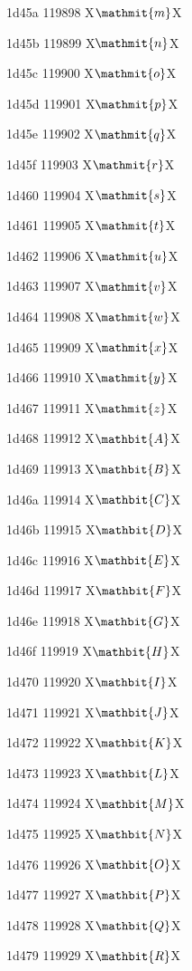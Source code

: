 \documentclass[11pt]{article}
\begin{document}
1d45a 119898 X{\ensuremath{\mathmit{m}}}X

1d45b 119899 X{\ensuremath{\mathmit{n}}}X

1d45c 119900 X{\ensuremath{\mathmit{o}}}X

1d45d 119901 X{\ensuremath{\mathmit{p}}}X

1d45e 119902 X{\ensuremath{\mathmit{q}}}X

1d45f 119903 X{\ensuremath{\mathmit{r}}}X

1d460 119904 X{\ensuremath{\mathmit{s}}}X

1d461 119905 X{\ensuremath{\mathmit{t}}}X

1d462 119906 X{\ensuremath{\mathmit{u}}}X

1d463 119907 X{\ensuremath{\mathmit{v}}}X

1d464 119908 X{\ensuremath{\mathmit{w}}}X

1d465 119909 X{\ensuremath{\mathmit{x}}}X

1d466 119910 X{\ensuremath{\mathmit{y}}}X

1d467 119911 X{\ensuremath{\mathmit{z}}}X

1d468 119912 X{\ensuremath{\mathbit{A}}}X

1d469 119913 X{\ensuremath{\mathbit{B}}}X

1d46a 119914 X{\ensuremath{\mathbit{C}}}X

1d46b 119915 X{\ensuremath{\mathbit{D}}}X

1d46c 119916 X{\ensuremath{\mathbit{E}}}X

1d46d 119917 X{\ensuremath{\mathbit{F}}}X

1d46e 119918 X{\ensuremath{\mathbit{G}}}X

1d46f 119919 X{\ensuremath{\mathbit{H}}}X

1d470 119920 X{\ensuremath{\mathbit{I}}}X

1d471 119921 X{\ensuremath{\mathbit{J}}}X

1d472 119922 X{\ensuremath{\mathbit{K}}}X

1d473 119923 X{\ensuremath{\mathbit{L}}}X

1d474 119924 X{\ensuremath{\mathbit{M}}}X

1d475 119925 X{\ensuremath{\mathbit{N}}}X

1d476 119926 X{\ensuremath{\mathbit{O}}}X

1d477 119927 X{\ensuremath{\mathbit{P}}}X

1d478 119928 X{\ensuremath{\mathbit{Q}}}X

1d479 119929 X{\ensuremath{\mathbit{R}}}X
\end{document}
